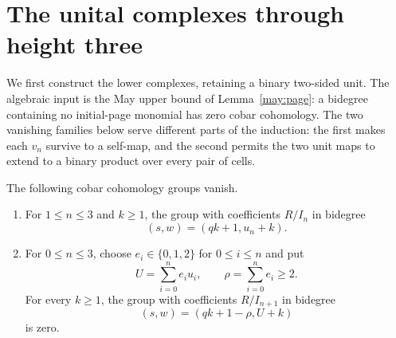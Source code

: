 \section{The unital complexes through height three}
\label{low:section}

We first construct the lower complexes, retaining a binary two-sided unit.
The algebraic input is the May upper bound of Lemma~\ref{may:page}:
a bidegree containing no initial-page monomial has zero cobar cohomology.
The two vanishing families below serve different parts of the induction:
the first makes each $v_n$ survive to a self-map, and the second permits
the two unit maps to extend to a binary product over every pair of cells.

\begin{lemma}
\label{low:algebraic-vanishing}
The following cobar cohomology groups vanish.
\begin{enumerate}
 \item For $1\leq n\leq3$ and $k\geq1$, the group with coefficients
 $R/I_n$ in bidegree
 \[
  (s,w)=(qk+1,u_n+k).
 \]
 \item For $0\leq n\leq3$, choose $e_i\in\{0,1,2\}$ for $0\leq i\leq n$
 and put
 \[
  U=\sum_{i=0}^n e_i u_i,\qquad
  \rho=\sum_{i=0}^n e_i\geq2.
 \]
 For every $k\geq1$, the group with coefficients $R/I_{n+1}$ in bidegree
 \[
  (s,w)=(qk+1-\rho,U+k)
 \]
 is zero.
\end{enumerate}
\end{lemma}

